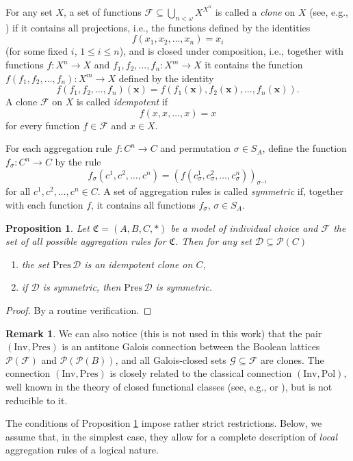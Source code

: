 \documentclass[graybox]{SNmult}
\newtheorem{prop}{Proposition}
\theoremstyle{definition}
\newtheorem*{rem}{Remark}
\begin{document}
\par For any set $X$, a set of functions $\mathcal F\subseteq \bigcup_{n<\omega} X^{X^n}$ is called a \textit{clone} on $X$ (see, e.g., \cite{Lau}) if it contains all projections, i.e., the functions defined by the identities
$$
f(x_1, x_2, \ldots, x_n)=x_i
$$
(for some fixed $i$, $1\leq i\leq n$),
and is closed under composition, i.e., together with functions $f:X^n\to X$ and $f_1, f_2, \ldots, f_n: X^m\to X$ it contains the function $f(f_1, f_2, \ldots, f_n): X^m\to X$ defined by the identity
$$
f( f_1, f_2, \ldots, f_n)(\bm x)= f( f_1(\bm x), f_2(\bm x), \ldots, f_n(\bm x)).
$$
A clone $\mathcal F$ on $X$ is called \textit{idempotent} if
$$
f(x, x, \ldots, x)=x
$$
for every function $f\in \mathcal F$ and $x\in X$.

\par For each aggregation rule $f:C^n\to C$ and permutation $\sigma\in S_A$, define the function $f_\sigma: C^n\to C$ by the rule
$$
f_\sigma(c^1, c^2, \ldots, c^n)=(f(c^1_\sigma, c^2_\sigma, \ldots, c^n_\sigma))_{\sigma^{-1}}
$$
for all $c^1, c^2, \ldots, c^n\in C$. A set of aggregation rules is called \textit{symmetric} if, together with each function $f$, it contains all functions $f_\sigma$, $\sigma\in S_A$.

\begin{prop}\label{Prop 1}
	Let $\mathfrak C=(A,  B, C, \ast)$ be a model of individual choice and $\mathcal F$ the set of all possible aggregation rules for $\mathfrak C$. Then for any set $\mathscr D\subseteq \mathscr P(C)$
	\begin{enumerate}
		\item the set $\mathrm{Pres}\,\mathscr D$ is an idempotent clone on $C$,
		\item if $\mathscr D$ is symmetric, then $\mathrm{Pres}\,\mathscr D$ is symmetric.
	\end{enumerate}
\end{prop}
\begin{proof}
	By a routine verification.
\end{proof}
\begin{rem}
	We can also notice (this is not used in this work) that the pair $(\mathrm{Inv}, \mathrm{Pres})$ is an antitone Galois connection between the Boolean lattices $\mathscr P(\mathcal F)$ and $\mathscr P(\mathscr P(B))$, and all Galois-closed sets $\mathcal G\subseteq \mathcal F$ are clones. The connection $(\mathrm{Inv}, \mathrm{Pres})$ is closely related to the classical connection $(\mathrm{Inv}, \mathrm{Pol})$, well known in the theory of closed functional classes (see, e.g., \cite{Lau} or \cite{Polyakov_Shamolin_clon}), but is not reducible to it.
\end{rem}
The conditions of Proposition \ref{Prop 1} impose rather strict restrictions. Below, we assume that, in the simplest case, they allow for a complete description of \textit{local} aggregation rules of a logical nature.
\end{document}
